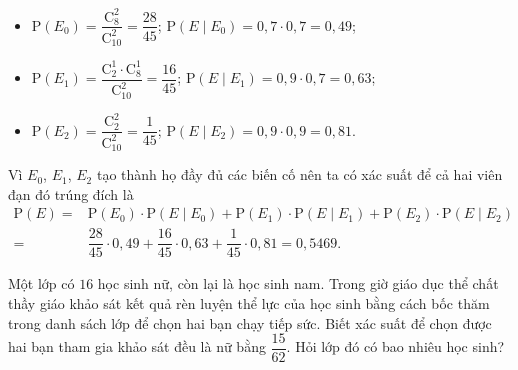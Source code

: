 \begin{ex}
{\begin{itemchoice}
\begin{itemize}
				\item $\mathrm{P}(E_{0})=  \dfrac{\mathrm{C}_{8}^2}{\mathrm{C}_{10}^2} =\dfrac{28}{45}$; $\mathrm{P}(E\mid E_{0})=0{,}7\cdot0{,}7=0{,}49$;
				\item $\mathrm{P}(E_{1})=\dfrac{\mathrm{C}_{2}^1 \cdot \mathrm{C}_8^1}{\mathrm{C}_{10}^2} =\dfrac{16}{45}$; $\mathrm{P}(E\mid E_{1})=0{,}9\cdot  0{,}7=0{,}63$;
				 \item $\mathrm{P}(E_{2})=\dfrac{\mathrm{C}_{2}^2}{\mathrm{C}_{10}^2} =\dfrac{1}{45} $; $ \mathrm{P}(E\mid E_{2})=0{,}9\cdot 0{,}9=0{,}81$.
			\end{itemize}
			 Vì $E_{0}$, $E_{1} $, $E_{2} $ tạo thành họ đầy đủ các biến cố nên ta có xác suất để cả hai viên đạn đó trúng đích là
			\begin{align*}
				\mathrm{P}(E)=& \mathrm{P}(E_{0})\cdot  \mathrm{P}(E\mid E_{0})+\mathrm{P}(E_{1})\cdot \mathrm{P}(E\mid E_{1})+\mathrm{P}(E_{2})\cdot\mathrm{P}(E\mid E_{2})\\
				 =& \dfrac{28}{45} \cdot 0{,}49+\dfrac{16}{45} \cdot 0{,}63+\dfrac{1}{45} \cdot 0{,}81=0{,}5469.
			\end{align*}
		\end{itemchoice}
	 }
\end{ex}



\begin{bt}%
	Một lớp có $16$ học sinh nữ, còn lại là học sinh nam. Trong giờ giáo dục thể chất thầy giáo khảo sát kết quả rèn luyện  thể lực của học sinh bằng cách bốc thăm trong danh sách lớp để chọn hai bạn chạy tiếp sức. Biết xác suất để chọn được hai bạn tham gia khảo sát đều là nữ bằng $\dfrac{15}{62}$. Hỏi lớp đó có bao nhiêu học sinh?
\end{bt}


